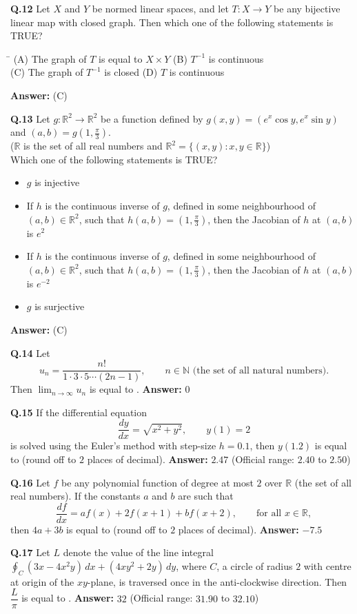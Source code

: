 \documentclass[11pt,a4paper]{article}
\newcommand{\optsfourA}[4]{%
  \begin{tabbing}
    \hspace{0.48\linewidth}\=\kill
    (A) #1 \> (B) #2 \\[2pt]
    (C) #3 \> (D) #4
  \end{tabbing}%
}
\newcommand{\optslistA}[4]{%
  \begin{itemize}
    \setlength{\itemsep}{2pt}\setlength{\parskip}{0pt}
    \item[(A)] #1
    \item[(B)] #2
    \item[(C)] #3
    \item[(D)] #4
  \end{itemize}%
}
\newcommand{\ans}[1]{\textbf{Answer:} #1\par\medskip}
\begin{document}
\textbf{Q.12} Let $X$ and $Y$ be normed linear spaces, and let $T : X \to Y$ be any bijective linear map with closed graph. Then which one of the following statements is TRUE?
\optsfourA{The graph of $T$ is equal to $X \times Y$}{$T^{-1}$ is continuous}{The graph of $T^{-1}$ is closed}{$T$ is continuous}
\ans{(C)}

\textbf{Q.13} Let $g : \mathbb{R}^2 \to \mathbb{R}^2$ be a function defined by $g(x, y) = (e^x \cos y, e^x \sin y)$ and $(a, b) = g\!\left(1, \frac{\pi}{3}\right)$.\\
($\mathbb{R}$ is the set of all real numbers and $\mathbb{R}^2 = \{(x, y) : x, y \in \mathbb{R}\}$)\\
Which one of the following statements is TRUE?
\optslistA{$g$ is injective}{If $h$ is the continuous inverse of $g$, defined in some neighbourhood of $(a, b) \in \mathbb{R}^2$, such that $h(a, b) = \left(1, \frac{\pi}{3}\right)$, then the Jacobian of $h$ at $(a, b)$ is $e^2$}{If $h$ is the continuous inverse of $g$, defined in some neighbourhood of $(a, b) \in \mathbb{R}^2$, such that $h(a, b) = \left(1, \frac{\pi}{3}\right)$, then the Jacobian of $h$ at $(a, b)$ is $e^{-2}$}{$g$ is surjective}
\ans{(C)}

\textbf{Q.14} Let
\[
  u_n = \frac{n!}{1 \cdot 3 \cdot 5 \cdots (2n - 1)}, \qquad n \in \mathbb{N} \text{ (the set of all natural numbers)}.
\]
Then $\lim_{n\to\infty} u_n$ is equal to \underline{\hspace{2cm}}.
\ans{$0$}

\textbf{Q.15} If the differential equation
\[
  \frac{dy}{dx} = \sqrt{x^2 + y^2}, \qquad y(1) = 2
\]
is solved using the Euler's method with step-size $h = 0.1$, then $y(1.2)$ is equal to \underline{\hspace{2cm}} (round off to $2$ places of decimal).
\ans{$2.47$ (Official range: $2.40$ to $2.50$)}

\textbf{Q.16} Let $f$ be any polynomial function of degree at most $2$ over $\mathbb{R}$ (the set of all real numbers). If the constants $a$ and $b$ are such that
\[
  \frac{df}{dx} = a f(x) + 2 f(x + 1) + b f(x + 2), \qquad \text{for all } x \in \mathbb{R},
\]
then $4a + 3b$ is equal to \underline{\hspace{2cm}} (round off to $2$ places of decimal).
\ans{$-7.5$}

\textbf{Q.17} Let $L$ denote the value of the line integral $\displaystyle\oint_C (3x - 4x^2 y)\,dx + (4xy^2 + 2y)\,dy$, where $C$, a circle of radius $2$ with centre at origin of the $xy$-plane, is traversed once in the anti-clockwise direction. Then $\dfrac{L}{\pi}$ is equal to \underline{\hspace{2cm}}.
\ans{$32$ (Official range: $31.90$ to $32.10$)}
\end{document}
